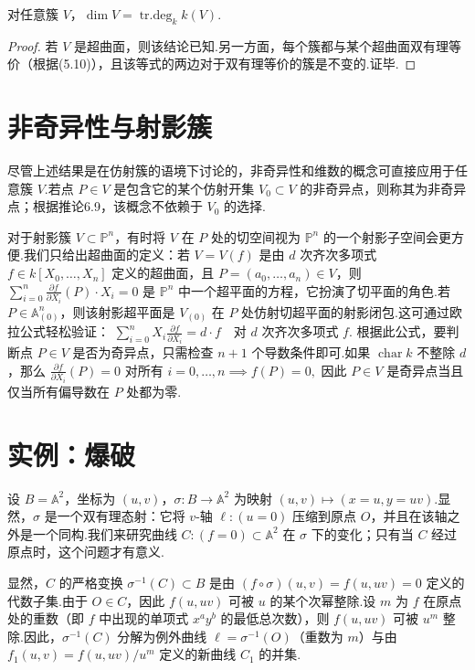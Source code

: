 \begin{theorem}
对任意簇 \(V\)，\(\dim V = \operatorname{tr.deg}_k k(V)\).
\end{theorem}
\begin{proof}
若 \(V\) 是超曲面，则该结论已知.另一方面，每个簇都与某个超曲面双有理等价（根据(5.10)），且该等式的两边对于双有理等价的簇是不变的.证毕.
\end{proof}

\section{非奇异性与射影簇}

尽管上述结果是在仿射簇的语境下讨论的，非奇异性和维数的概念可直接应用于任意簇 \(V\).若点 \(P \in V\) 是包含它的某个仿射开集 \(V_0 \subset V\) 的非奇异点，则称其为非奇异点；根据推论6.9，该概念不依赖于 \(V_0\) 的选择.

对于射影簇 \(V \subset \mathbb{P}^n\)，有时将 \(V\) 在 \(P\) 处的切空间视为 \(\mathbb{P}^n\) 的一个射影子空间会更方便.我们只给出超曲面的定义：若 \(V = V(f)\) 是由 \(d\) 次齐次多项式 \(f \in k[X_0, \ldots, X_n]\) 定义的超曲面，且 \(P = (a_0, \ldots, a_n) \in V\)，则
\(
\sum_{i=0}^n \frac{\partial f}{\partial X_i}(P) \cdot X_i = 0
\)
是 \(\mathbb{P}^n\) 中一个超平面的方程，它扮演了切平面的角色.若 \(P \in \mathbb{A}_{(0)}^n\)，则该射影超平面是 \(V_{(0)}\) 在 \(P\) 处仿射切超平面的射影闭包.这可通过欧拉公式轻松验证：
\(
\sum_{i=0}^n X_i \frac{\partial f}{\partial X_i} = d \cdot f \quad \text{对 } d \text{ 次齐次多项式 } f.
\)
根据此公式，要判断点 \(P \in V\) 是否为奇异点，只需检查 \(n+1\) 个导数条件即可.如果 \(\operatorname{char} k\) 不整除 \(d\)，那么
\(
\frac{\partial f}{\partial X_i}(P) = 0 \text{ 对所有 } i=0, \ldots, n \implies f(P) = 0,
\)
因此 \(P \in V\) 是奇异点当且仅当所有偏导数在 \(P\) 处都为零.

\section{实例：爆破}

设 \(B = \mathbb{A}^2\)，坐标为 \((u, v)\)，\(\sigma: B \to \mathbb{A}^2\) 为映射 \((u,v) \mapsto (x=u, y=uv)\).显然，\(\sigma\) 是一个双有理态射：它将 \(v\)-轴 \(\ell: (u=0)\) 压缩到原点 \(O\)，并且在该轴之外是一个同构.我们来研究曲线 \(C: (f=0) \subset \mathbb{A}^2\) 在 \(\sigma\) 下的变化；只有当 \(C\) 经过原点时，这个问题才有意义.

显然，\(C\) 的严格变换 \({\sigma}^{-1}(C) \subset B\) 是由 \( (f \circ \sigma)(u,v) = f(u, uv) = 0 \) 定义的代数子集.由于 \(O \in C\)，因此 \(f(u, uv)\) 可被 \(u\) 的某个次幂整除.设 \(m\) 为 \(f\) 在原点处的重数（即 \(f\) 中出现的单项式 \(x^a y^b\) 的最低总次数），则 \(f(u, uv)\) 可被 \(u^m\) 整除.因此，\({\sigma}^{-1}(C)\) 分解为例外曲线 \(\ell = {\sigma}^{-1}(O)\)（重数为 \(m\)）与由 \(f_1(u,v) = f(u, uv)/u^m\) 定义的新曲线 \(C_1\) 的并集.

